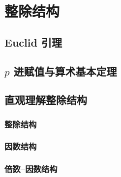 
\section{整除结构}
\frame{}%
\subsection{Euclid 引理}
\begin{frame}[c]
  \progressnow*
\end{frame}
\frame{}%
\subsection{\texorpdfstring{$p$}{p} 进赋值与算术基本定理}
\begin{frame}[c]
  \progressnow*
\end{frame}
\frame{}%
\subsection{直观理解整除结构}
\begin{frame}[c]
  \progressnow*
\end{frame}
\frame{}%
\subsubsection{整除结构}
\begin{frame}[c]
  \progressnow
\end{frame}
\frame{}%
\subsubsection{因数结构}
\begin{frame}[c]
  \progressnow
\end{frame}
\frame{}%
\subsubsection{倍数–因数结构}
\begin{frame}[c]
  \progressnow
\end{frame}
\frame{}%
